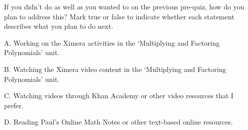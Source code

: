 \documentclass{ximera}
\begin{document}
\begin{question}

If you didn't do as well as you wanted to on the previous pre-quiz, how do you plan to address this?  Mark true or false to indicate whether each statement describes what you plan to do next.

\vspace{1 in}

\begin{question}

    A. Working on the Ximera activities in the `Multiplying and Factoring Polynomials' unit.

    \begin{multipleChoice}
    \end{multipleChoice}
    
\end{question}
\begin{question}
    
    B. Watching the Ximera video content in the `Multiplying and Factoring Polynomials' unit. 
    
    \begin{multipleChoice}
    \end{multipleChoice}
    
\end{question}
\begin{question}
    
    C. Watching videos through Khan Academy or other video resources that I prefer.

    \begin{multipleChoice}
    \end{multipleChoice}
    
\end{question}
\begin{question}
    
    D. Reading Paul's Online Math Notes or other text-based online resources.

    \begin{multipleChoice}
    \end{multipleChoice}
    
\end{question}
\begin{question}
    

\end{question}
\end{question}
\end{document}

